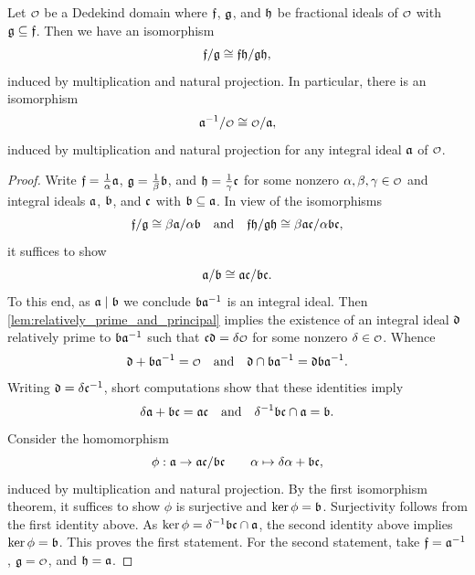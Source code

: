     \begin{lemma}\label{lem:cancellation_isomorphism}
      Let \(\smc{O}\) be a Dedekind domain where \(\mathfrak{f}\), \(\mathfrak{g}\), and \(\mathfrak{h}\) be fractional ideals of \(\smc{O}\) with \(\mathfrak{g} \subseteq \mathfrak{f}\). Then we have an isomorphism
      \[
        \mathfrak{f}/\mathfrak{g} \cong \mathfrak{f}\mathfrak{h}/\mathfrak{g}\mathfrak{h},
      \]
      induced by multiplication and natural projection. In particular, there is an isomorphism
      \[
        \mf{a}^{-1}/\smc{O} \cong \smc{O}/\mf{a},
      \]
      induced by multiplication and natural projection for any integral ideal \(\mathfrak{a}\) of \(\smc{O}\).
    \end{lemma}
    \begin{proof}
      Write \(\mathfrak{f} = \frac{1}{\alpha}\mathfrak{a}\), \(\mathfrak{g} = \frac{1}{\beta}\mathfrak{b}\), and \(\mathfrak{h} = \frac{1}{\gamma}\mathfrak{c}\) for some nonzero \(\a,\b,\g \in \smc{O}\) and integral ideals \(\mathfrak{a}\), \(\mathfrak{b}\), and \(\mathfrak{c}\) with \(\mathfrak{b} \subseteq \mathfrak{a}\). In view of the isomorphisms
      \[
        \mathfrak{f}/\mathfrak{g} \cong \beta\mathfrak{a}/\alpha\mathfrak{b} \quad \text{and} \quad \mathfrak{f}\mathfrak{h}/\mathfrak{g}\mathfrak{h} \cong \beta\mathfrak{a}\mathfrak{c}/\alpha\mathfrak{b}\mathfrak{c},
      \]
      it suffices to show
      \[
        \mathfrak{a}/\mathfrak{b} \cong \mathfrak{a}\mathfrak{c}/\mathfrak{b}\mathfrak{c}.
      \]
      To this end, as \(\mathfrak{a} \mid \mathfrak{b}\) we conclude \(\mathfrak{b}\mathfrak{a}^{-1}\) is an integral ideal. Then \cref{lem:relatively_prime_and_principal} implies the existence of an integral ideal \(\mathfrak{d}\) relatively prime to \(\mathfrak{b}\mathfrak{a}^{-1}\) such that \(\mf{c}\mf{d} = \d\smc{O}\) for some nonzero \(\d \in \smc{O}\). Whence
      \[
        \mf{d}+\mf{b}\mf{a}^{-1} = \smc{O} \quad \text{and} \quad \mf{d} \cap \mf{b}\mf{a}^{-1} = \mf{d}\mf{b}\mf{a}^{-1}.
      \]
      Writing \(\mathfrak{d} = \delta\mathfrak{c}^{-1}\), short computations show that these identities imply
      \[
        \delta\mathfrak{a}+\mathfrak{b}\mathfrak{c} = \mathfrak{a}\mathfrak{c} \quad \text{and} \quad \delta^{-1}\mathfrak{b}\mathfrak{c} \cap \mathfrak{a} = \mathfrak{b}.
      \]
      Consider the homomorphism
      \[
        \phi:\mathfrak{a} \to \mathfrak{a}\mathfrak{c}/\mathfrak{b}\mathfrak{c} \qquad \alpha \mapsto \delta\alpha+\mathfrak{b}\mathfrak{c},
      \]
      induced by multiplication and natural projection. By the first isomorphism theorem, it suffices to show \(\phi\) is surjective and \(\ker\phi = \mathfrak{b}\). Surjectivity follows from the first identity above. As \(\ker\phi = \delta^{-1}\mathfrak{b}\mathfrak{c} \cap \mathfrak{a}\), the second identity above implies \(\ker\phi = \mathfrak{b}\). This proves the first statement. For the second statement, take \(\mathfrak{f} = \mathfrak{a}^{-1}\), \(\mf{g} = \smc{O}\), and \(\mathfrak{h} = \mathfrak{a}\).
    \end{proof}


